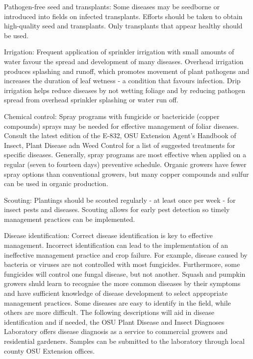 Pathogen-free seed and transplants: Some diseases may be seedborne or introduced into fields on infected transplants. Efforts should be taken to obtain high-quality seed and transplants. Only transplants that appear healthy should be used.

Irrigation: Frequent application of sprinkler irrigation with small amounts of water favour the spread and development of many diseases. Overhead irrigation produces splashing and runoff, which promotes movement of plant pathogens and increases the duration of leaf wetness - a condition that favours infection. Drip irrigation helps reduce diseases by not wetting foliage and by reducing pathogen spread from overhead sprinkler splashing or water run off. 

Chemical control: Spray programs with fungicide or bactericide (copper compounds) sprays may be needed for effective management of foliar diseases. Consult the latest edition of the E-832, OSU Extension Agent's Handbook of Insect, Plant Disease adn Weed Control for a list of suggested treatments for specific diseases. Generally, spray programs are most effective when applied on a regular (seven to fourteen days) preventive schedule. Organic growers have fewer spray options than conventional growers, but many copper compounds and sulfur can be used in organic production.

Scouting: Plantings should be scouted regularly - at least once per week - for insect pests and diseases. Scouting allows for early pest detection so timely management practices can be implemented. 

Disease identification: Correct disease identification is key to effective management. Incorrect identification can lead to the implementation of an ineffective management practice and crop failure. For example, disease caused by bacteria or viruses are not controlled with most fungicides. Furthermore, some fungicides will control one fungal disease, but not another. Squash and pumpkin growers shuld learn to recognise the more common diseases by their symptoms and have sufficient knowledge of disease development to select appropriate management practices. Some diseases are easy to identify in the field, while others are more difficult. The following descriptions will aid in disease identification and if needed, the OSU Plant Disease and Insect Diagnoses Laboratory offers disease diagnosis as a service to commercial growers and residential gardeners. Samples can be submitted to the laboratory through local county OSU Extension offices.

